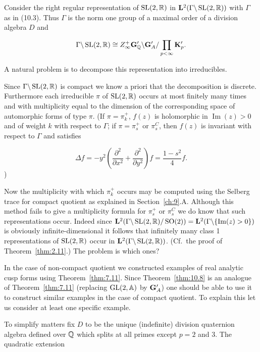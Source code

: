 \begin{remark}\label{rem:10.9}

Consider the right regular representation of $\operatorname{SL}(2, \mathbb{R})$ in $\mathbf{L}^2(\Gamma \backslash \operatorname{SL}(2, \mathbb{R}))$ with $\Gamma$ as in (10.3). Thus $\Gamma$ is the norm one group of a maximal order of a division algebra $D$ and

\[
\Gamma \backslash \operatorname{SL}(2, \mathbb{R}) \cong Z_\infty^+ \mathbf{G}'_{\mathbb{Q}} \backslash \mathbf{G}'_A / \prod_{p < \infty} \mathbf{K}'_p.
\]

A natural problem is to decompose this representation into irreducibles.

Since $\Gamma \backslash \operatorname{SL}(2, \mathbb{R})$ is compact we know a priori that the decomposition is discrete. Furthermore each irreducible $\pi$ of $\operatorname{SL}(2, \mathbb{R})$ occurs at most finitely many times and with multiplicity equal to the dimension of the corresponding space of automorphic forms of type $\pi$. (If $\pi = \pi_k^+$, $f(z)$ is holomorphic in $\operatorname{Im}(z) > 0$ and of weight $k$ with respect to $\Gamma$; if $\pi = \pi_s^+$ or $\pi_s^C$, then $f(z)$ is invariant with respect to $\Gamma$ and satisfies

\[
\Delta f = -y^2\left(\frac{\partial^2}{\partial x^2} + \frac{\partial^2}{\partial y^2}\right)f = \frac{1 - s^2}{4}f.
\])

Now the multiplicity with which $\pi_k^+$ occurs may be computed using the Selberg trace for compact quotient as explained in Section~\ref{ch:9}.A. Although this method fails to give a multiplicity formula for $\pi_s^+$ or $\pi_s^C$ we do know that such representations occur. Indeed since $\mathbf{L}^2(\Gamma \backslash \operatorname{SL}(2, \mathbb{R})/\operatorname{SO}(2)) = \mathbf{L}^2(\Gamma \backslash \{\operatorname{Im}(z) > 0\})$ is obviously infinite-dimensional it follows that infinitely many class 1 representations of $\operatorname{SL}(2, \mathbb{R})$ occur in $\mathbf{L}^2(\Gamma \backslash \operatorname{SL}(2, \mathbb{R}))$. (Cf.\ the proof of Theorem~\ref{thm:2.11}.) The problem is which ones?

In the case of non-compact quotient we constructed examples of real analytic cusp forms using Theorem~\ref{thm:7.11}. Since Theorem~\ref{thm:10.8} is an analogue of Theorem~\ref{thm:7.11} (replacing $\operatorname{GL}(2, \mathbb{A})$ by $\mathbf{G}'_A$) one should be able to use it to construct similar examples in the case of compact quotient. To explain this let us consider at least one specific example.

To simplify matters fix $D$ to be the unique (indefinite) division quaternion algebra defined over $\mathbb{Q}$ which splits at all primes except $p = 2$ and 3. The quadratic extension


\end{remark}

